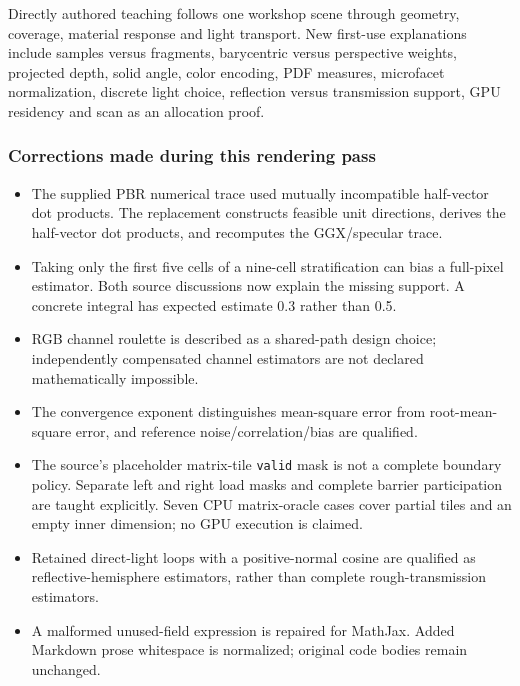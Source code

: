 Directly authored teaching follows one workshop scene through geometry, coverage, material response and light transport. New first-use explanations include samples versus fragments, barycentric versus perspective weights, projected depth, solid angle, color encoding, PDF measures, microfacet normalization, discrete light choice, reflection versus transmission support, GPU residency and scan as an allocation proof.

\subsubsection{Corrections made during this rendering pass}\label{appendix-3b67654799a2-corrections-made-during-this-rendering-pass}

\begin{itemize}
\tightlist
\item
  The supplied PBR numerical trace used mutually incompatible half-vector dot products. The replacement constructs feasible unit directions, derives the half-vector dot products, and recomputes the GGX/specular trace.
\item
  Taking only the first five cells of a nine-cell stratification can bias a full-pixel estimator. Both source discussions now explain the missing support. A concrete integral has expected estimate 0.3 rather than 0.5.
\item
  RGB channel roulette is described as a shared-path design choice; independently compensated channel estimators are not declared mathematically impossible.
\item
  The convergence exponent distinguishes mean-square error from root-mean-square error, and reference noise/correlation/bias are qualified.
\item
  The source's placeholder matrix-tile \texttt{valid} mask is not a complete boundary policy. Separate left and right load masks and complete barrier participation are taught explicitly. Seven CPU matrix-oracle cases cover partial tiles and an empty inner dimension; no GPU execution is claimed.
\item
  Retained direct-light loops with a positive-normal cosine are qualified as reflective-hemisphere estimators, rather than complete rough-transmission estimators.
\item
  A malformed unused-field expression is repaired for MathJax. Added Markdown prose whitespace is normalized; original code bodies remain unchanged.
\end{itemize}

